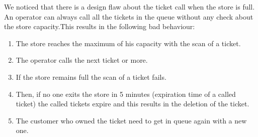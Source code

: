 \vskip 0.8cm

We noticed that there is a design flaw about the ticket call when the store is full. An operator can always call all the tickets in the queue without any check about the store capacity.\newline This results in the following bad behaviour:
\begin{enumerate}
	\item The store reaches the maximum of his capacity with the scan of a ticket.
	\item The operator calls the next ticket or more.
	\item If the store remains full the scan of a ticket fails.
	\item Then, if no one exits the store in 5 minutes (expiration time of a called ticket) the called tickets expire and this results in the deletion of the ticket.
	\item The customer who owned the ticket need to get in queue again with a new one.
\end{enumerate}